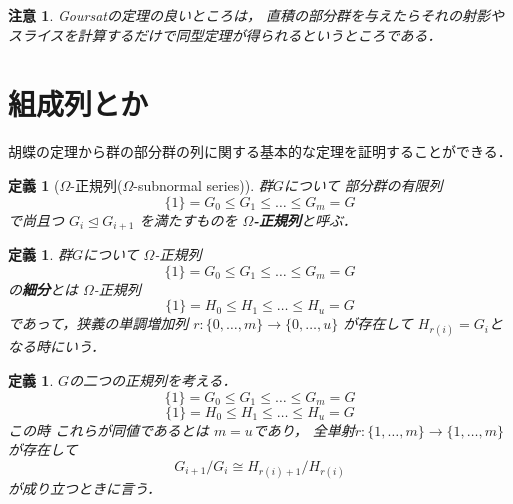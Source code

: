 \documentclass[leqno]{jsarticle}
\newtheorem{df}[thm]{定義}
\newtheorem*{rmk}{注意}
\begin{document}
\begin{rmk}
Goursatの定理の良いところは，
直積の部分群を与えたらそれの射影やスライスを計算するだけで同型定理が得られるというところである．
\end{rmk}

\section{組成列とか}

胡蝶の定理から群の部分群の列に関する基本的な定理を証明することができる．

\begin{df}[$\Omega$-正規列($\Omega$-subnormal series)]
群$G$について
部分群の有限列
\[
\{1\}=G_{0}\le G_{1}\le \dots \le G_{m}=G
\]
で尚且つ
$G_{i}\trianglelefteq G_{i+1}$
を満たすものを
\textbf{$\Omega$-正規列}と呼ぶ．
\end{df}
\begin{df}
群$G$について
$\Omega$-正規列
\[
\{1\}=G_{0}\le G_{1}\le \dots \le G_{m}=G
\]
の\textbf{細分}とは
$\Omega$-正規列
\[
\{1\}=H_{0}\le H_{1}\le \dots \le H_{u}=G
\]
であって，狭義の単調増加列
$r\colon \{0, \dots, m\}\to \{0, \dots, u\}$
が存在して
$H_{r(i)}=G_{i}$となる時にいう．
\end{df}

\begin{df}
$G$の二つの正規列を考える．
\[
\{1\}=G_{0}\le G_{1}\le \dots \le G_{m}=G
\]
\[
\{1\}=H_{0}\le H_{1}\le \dots \le H_{u}=G
\]
この時
これらが同値であるとは
$m=u$であり，
全単射$r\colon \{1, \dots, m\}\to \{1, \dots, m\}$
が存在して
\[
G_{i+1}/G_{i}\cong H_{r(i)+1}/H_{r(i)}
\]
が成り立つときに言う．

\end{df}
\end{document}
